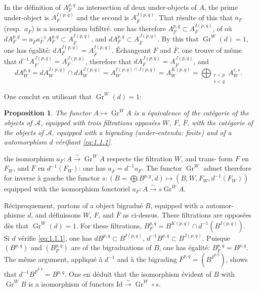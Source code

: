 \documentclass[12pt,a4paper]{article}
\theoremstyle{plain}
\newtheorem{proposition}[lemme]{Proposition}
\theoremstyle{definition}
\DeclareMathOperator{\Gr}{Gr}
\newcommand{\A}{\mathcal{A}}
\begin{document}
In the d\'{e}finition of $A_F^{p,q}$ as intersection of deux under-objects of $A$, the
prime under-object is $A_{F}^{I(p,q)}$ and the second is $A_{\bar{F}}^{J(p,q)}$. That r\'{e}sulte of this that
$a_F$ (resp.~$a_{\bar{F}}$) is a isomorphism bifiltr\'{e}. one has therefore $A_F^{p,q} \subset A_F^{I(p,q)}$,
of o\`{u}
$d A_F^{p,q} = a_{\bar{F}} a_F^{-1} A_F^{p,q} \subset A_{\bar{F}}^{I(p,q)}$, and $d A_F^{p,q} \subset A_{\bar{F}}^{J(p,q)}$. By this that $\Gr^W(d) = 1$, one has \'{e}galit\'{e}: $d A_F^{I(p,q)} = A_{\bar{F}}^{I(p,q)}$. \'{E}changeant $F$ and $\bar{F}$, one trouve of m\^{e}me that
$d^{-1} A_{\bar{F}}^{J(p,q)} = A_F^{J(p,q)}$, therefore that $d A_F^{J(p,q)} = A_{\bar{F}}^{J(p,q)}$, and
\begin{equation*}
d A_W^{p,q} = d A_W^{I(p,q)} \cap d A_W^{J(p,q)} = A_W^{I(p,q) \cap J(p,q)}
= A_W^{K(p,q)} = \bigoplus_{\substack{r < p \\ s < q}} A_W^{r,s}.
\end{equation*}

One conclut en utilisant that $\Gr^W(d) = 1$:

\begin{proposition}\label{prop:1.2}
The functor $A \mapsto \Gr^W\!A$ is a \'{e}quivalence of the cat\'{e}gorie of the objects of $\A$, equipped with trois filtrations oppos\'{e}es $W$, $F$, $\bar{F}$, with the
cat\'{e}gorie of the objects of $\A$, equipped with a bigrading (under-entendu: finite) and
of a automorphism $d$ v\'{e}rifiant \eqref{eq:1.1.1}.
\end{proposition}

the isomorphism $a_F : A \xrightarrow{\sim} \Gr^W\!A$ respecte the filtration $W$, and trans-
form $F$ en $F_W$, and $\bar{F}$ en $d^{-1}(F_W)$: one has $a_{\bar{F}} = d^{-1} a_F$. The functor $\Gr^W$
admet therefore for inverse \`{a} gauche the functor $s : (B = \bigoplus B^{p,q}, d) \mapsto
(B, W, F_W, d^{-1}(F_W))$ equipped with the isomorphism fonctoriel $a_F : A \xrightarrow{\sim} s\Gr^W\!A$.

R\'{e}ciproquement, partons of a object bigradu\'{e} $B$, equipped with a automor-
phisme $d$, and d\'{e}finissons $W$, $F$, and $\bar{F}$ as ci-dessus. These filtrations
are oppos\'{e}es d\`{e}s that $\Gr^W(d) = 1$. For these filtrations, $B_F^{p,q} = B^{K(p,q)} \cap
d^{-1}(B^{I(p,q)})$. Si $d$ v\'{e}rifie \eqref{eq:1.1.1}, one has $d B^{p,q} \subset B^{I(p,q)}$, $d^{-1} B^{p,q} \subset B^{J(p,q)}$.
Puisque $(B^{p,q})$ and $(B_F^{p,q})$ are of the bigraduations of $B$, one has \'{e}galit\'{e}: $B_F^{p,q} =
B^{p,q}$. The m\^{e}me argument, appliqu\'{e} \`{a} $d^{-1}$ and \`{a} the bigrading $\bar{F}^{p,q} =
(B^{\bar{F}^{p,q}})$, shows that $d^{-1} B^{\bar{F}^{p,q}} = B^{p,q}$. One en d\'{e}duit that the isomorphism
\'{e}vident of $B$ with $\Gr^W\!B$ is a isomorphism of functors $\mathrm{Id} \xrightarrow{\sim} \Gr^W \circ s$.
\end{document}
